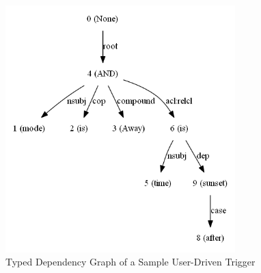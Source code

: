 \begin{figure}[t]
    \includegraphics[width=3.5in]{figs/dep_good.png}
    \caption{Typed Dependency Graph of a Sample User-Driven Trigger}
    \label{fig:dep-tree}
\end{figure}


